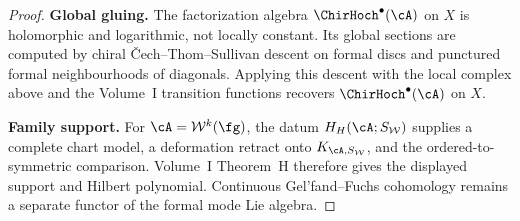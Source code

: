 \begin{proof}
\medskip
\noindent\textbf{Global gluing.}
The factorization algebra \(\ChirHoch^\bullet(\cA)\) on \(X\) is
holomorphic and logarithmic, not locally constant. Its global sections
are computed by chiral \v{C}ech--Thom--Sullivan descent on formal discs
and punctured formal neighbourhoods of diagonals. Applying this descent
with the local complex above and the Volume~I transition functions
recovers \(\ChirHoch^\bullet(\cA)\) on \(X\).

\medskip
\noindent\textbf{Family support.}
For $\cA=\mathcal W^k(\fg)$, the datum
$H_H(\cA;S_{\mathcal W})$ supplies a complete chart model, a
deformation retract onto $K_{\cA,S_{\mathcal W}}$, and the
ordered-to-symmetric comparison.  Volume~I Theorem~H therefore gives
the displayed support and Hilbert polynomial.  Continuous
Gel'fand--Fuchs cohomology remains a separate functor of the formal
mode Lie algebra.
\end{proof}

